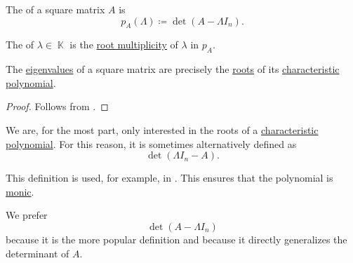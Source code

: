 \begin{definition}\label{def:characteristic_polynomial}\mimprovised
  The  of a square matrix \( A \) is
  \begin{equation*}
    p_A(\Lambda) \coloneqq \det(A - \Lambda I_n).
  \end{equation*}

  The  of \( \lambda \in \BbbK \) is the \hyperref[def:polynomial_root]{root multiplicity} of \( \lambda \) in \( p_A \).
\end{definition}

\begin{proposition}\label{thm:eigenvalues_and_characteristic_polynomials}
  The \hyperref[def:eigenpair]{eigenvalues} of a square matrix are precisely the \hyperref[def:polynomial_root]{roots} of its \hyperref[def:characteristic_polynomial]{characteristic polynomial}.
\end{proposition}
\begin{proof}
  Follows from .
\end{proof}

\begin{remark}\label{rem:characteristic_polynomial}
  We are, for the most part, only interested in the roots of a \hyperref[def:characteristic_polynomial]{characteristic polynomial}. For this reason, it is sometimes alternatively defined as
  \begin{equation*}
    \det(\Lambda I_n - A).
  \end{equation*}

  This definition is used, for example, in \cite[74]{Knapp2016BasicAlgebra}. This ensures that the polynomial is \hyperref[def:monic_polynomial]{monic}.

  We prefer
  \begin{equation*}
    \det(A - \Lambda I_n)
  \end{equation*}
  because it is the more popular definition and because it directly generalizes the determinant of \( A \).
\end{remark}

